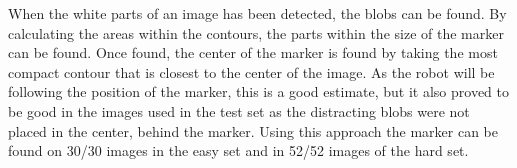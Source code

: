 When the white parts of an image has been detected, the blobs can be found.
By calculating the areas within the contours, the parts within the size of the marker can be found.
Once found, the center of the marker is found by taking the most compact contour that is closest to the center of the image.
As the robot will be following the position of the marker, this is a good estimate, but it also proved to be good in the images used in the test set as the distracting blobs were not placed in the center, behind the marker.
Using this approach the marker can be found on 30/30 images in the easy set and in 52/52 images of the hard set.

